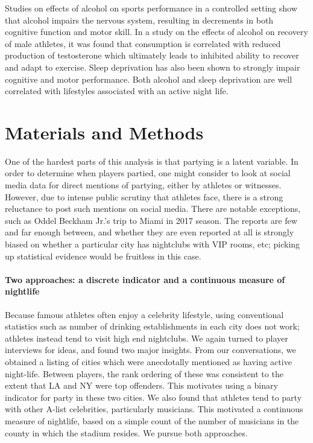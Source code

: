 \documentclass[letterpaper,12pt]{article}
\begin{document}
Studies on effects of alcohol on sports performance in a controlled setting
show that alcohol impairs the nervous system, resulting in decrements in both
cognitive function and motor skill.\cite{shirreffs} In a study on 
the effects of alcohol on recovery of male athletes, it was found that
consumption is correlated with reduced production of testosterone
which ultimately leads to inhibited ability to recover and adapt to exercise.\cite{mjbarnes}
Sleep deprivation has also been shown to strongly impair cognitive and motor performance.\cite{pilcher} Both alcohol and sleep deprivation are well correlated with lifestyles associated
with an active night life.

\section{Materials and Methods}
One of the hardest parts of this analysis is that partying is a latent variable.
In order to determine when players partied, one might consider to look at social media data
for direct mentions of partying, either by athletes or witnesses. However, due to
intense public scrutiny that athletes face, there is a strong reluctance to post
such mentions on social media. There are notable exceptions, such
as Oddel Beckham Jr.'s trip to Miami in 2017 season.\cite{bleler}
The reports are few and far enough between,
and whether they are even reported at all is strongly biased on whether a particular city 
has nightclubs with VIP rooms, etc; picking up statistical evidence would be fruitless in this case.

\paragraph{Two approaches: a discrete indicator and a continuous measure of nightlife}
Because famous athletes often enjoy a celebrity lifestyle, using conventional statistics
such as number of drinking establishments in each city does not work; athletes instead
tend to visit high end nightclubs. We again turned to player interviews for ideas,
and found two major insights. From our conversations, 
we obtained a listing of cities which were anecdotally
mentioned as having active night-life. Between players, the rank ordering of these
was consistent to the extent that LA and NY were top
offenders. This motivates using a binary indicator for party in these two cities. 
We also found that athletes tend to party with other A-list celebrities,
particularly musicians. This motivated a continuous measure of nightlife, based on a
simple count of the number of musicians in the county in which the stadium resides. 
We pursue both approaches.
\end{document}
